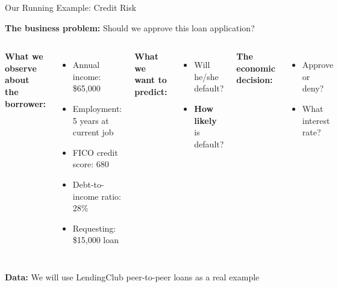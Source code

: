 \documentclass[10pt]{beamer}
\newcommand{\highlight}[1]{\textcolor{AccentOrange}{\textbf{#1}}}
\begin{document}
\begin{frame}{Our Running Example: Credit Risk}

  \textbf{The business problem:} Should we approve this loan application?

  \vspace{1em}
  \begin{columns}[T]
    \textbf{What we observe about the borrower:}
    \begin{itemize}
      \item Annual income: \$65,000
      \item Employment: 5 years at current job
      \item FICO credit score: 680
      \item Debt-to-income ratio: 28\%
      \item Requesting: \$15,000 loan
    \end{itemize}

    \textbf{What we want to predict:}
    \begin{itemize}
      \item Will he/she default?
      \item \highlight{How likely} is default?
    \end{itemize}

    \vspace{1em}
    \textbf{The economic decision:}
    \begin{itemize}
      \item Approve or deny?
      \item What interest rate?
    \end{itemize}
  \end{columns}

  \vspace{2em}
  \textbf{Data:} We will use LendingClub peer-to-peer loans as a real example
\end{frame}

\end{document}
